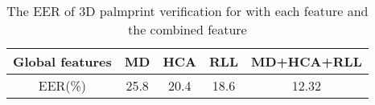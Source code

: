 \begin{table}[htbp]
  \centering
  \caption{The EER of 3D palmprint verification for with each feature and the combined feature}
    \begin{tabular}{|c|c|c|c|c|}
    \hline
    Global features & MD    & HCA   & RLL   & MD+HCA+RLL \\
    \hline
    EER(\%) & 25.8  & 20.4  & 18.6  & 12.32 \\
    \hline
    \end{tabular}%
  \label{tab:experiment:verification}%
\end{table}%
